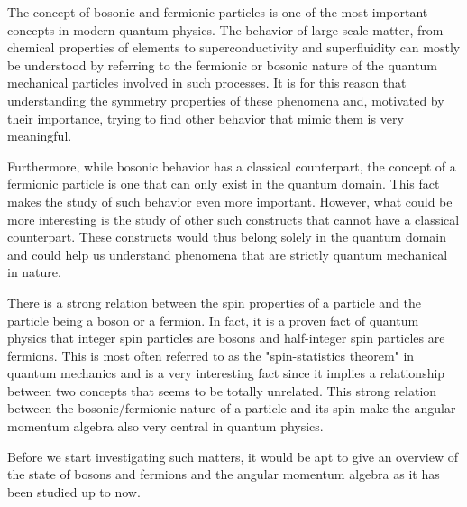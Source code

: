The concept of bosonic and fermionic particles is one of the most important concepts
in modern quantum physics. The behavior of large scale matter, from chemical properties
of elements to superconductivity and superfluidity can mostly be understood by
referring to the fermionic or bosonic nature of the quantum mechanical particles
involved in such processes. It is for this reason that understanding the symmetry
properties of these phenomena and, motivated by their importance, trying to find
other behavior that mimic them is very meaningful.

Furthermore, while bosonic behavior has a classical counterpart, the concept of a fermionic
particle is one that can only exist in the quantum domain. This fact makes the study
of such behavior even more important. However, what could be more interesting is the
study of other such constructs that cannot have a classical counterpart. These constructs
would thus belong solely in the quantum domain and could help us understand phenomena that
are strictly quantum mechanical in nature.

There is a strong relation between the spin properties of a particle and the particle being
a boson or a fermion. In fact, it is a proven fact of quantum physics that integer spin
particles are bosons and half-integer spin particles are fermions. This is most often referred
to as the "spin-statistics theorem" in quantum mechanics and is a very interesting fact since
it implies a relationship between two concepts that seems to be totally unrelated. This
strong relation between the bosonic/fermionic nature of a particle and its spin make the
angular momentum algebra also very central in quantum physics.

Before we start investigating such matters, it would be apt to give an overview of the
state of bosons and fermions and the angular momentum algebra as it has been studied up to
now.


